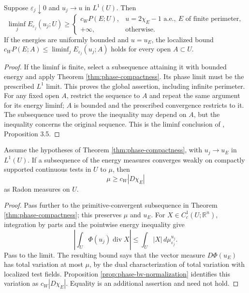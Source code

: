 \begin{theorem}\label{thm:phase-liminf}
Suppose $\varepsilon_j\downarrow0$ and $u_j\to u$ in $L^1(U)$. Then
\[
 \liminf_j E_{\varepsilon_j}(u_j;U)\geq
 \begin{cases}
 c_WP(E;U),&u=2\chi_E-1\text{ a.e.},\ E\text{ of finite perimeter},\\
 +\infty,&\text{otherwise}.
 \end{cases}
\]
If the energies are uniformly bounded and $u=u_E$, the localized bound
$c_WP(E;A)\leq\liminf_j E_{\varepsilon_j}(u_j;A)$ holds for every open $A\subset U$.
\end{theorem}
\begin{proof}
If the liminf is finite, select a subsequence attaining it with bounded energy and apply Theorem \ref{thm:phase-compactness}. Its phase limit must be the prescribed $L^1$ limit. This proves the global assertion, including infinite perimeter. For any fixed open $A$, restrict the sequence to $A$ and repeat the same argument for its energy liminf; $A$ is bounded and the prescribed convergence restricts to it. The subsequence used to prove the inequality may depend on $A$, but the inequality concerns the original sequence. This is the liminf conclusion of \cite{ChAC}, Proposition 3.5.
\end{proof}

\begin{proposition}\label{prop:phase-measure-bound}
Assume the hypotheses of Theorem \ref{thm:phase-compactness}, with $u_j\to u_E$ in $L^1(U)$. If a subsequence of the energy measures converges weakly on compactly supported continuous tests in $U$ to $\mu$, then
\[
 \mu\geq c_W|D\chi_E|
\]
as Radon measures on $U$.
\end{proposition}
\begin{proof}
Pass further to the primitive-convergent subsequence in Theorem \ref{thm:phase-compactness}; this preserves $\mu$ and $u_E$. For $X\in C_c^1(U;\mathbb R^n)$, integration by parts and the pointwise energy inequality give
\[
 \left|\int_U\Phi(u_j)\operatorname{div}X\right|
 \leq\int_U|X|\,d\mu_{\varepsilon_j}^{u_j}.
\]
Pass to the limit. The resulting bound says that the vector measure $D\Phi(u_E)$ has total variation at most $\mu$, by the dual characterization of total variation with localized test fields. Proposition \ref{prop:phase-bv-normalization} identifies this variation as $c_W|D\chi_E|$. Equality is an additional assertion and need not hold.
\end{proof}

